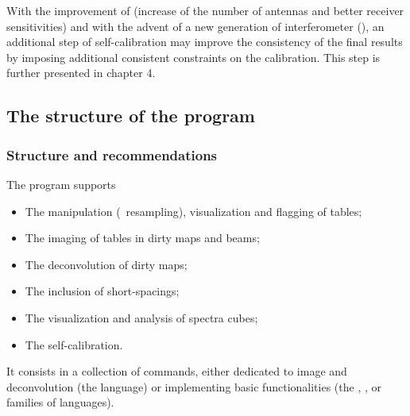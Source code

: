 With the improvement of \NOEMA{} (increase of the number of antennas and
better receiver sensitivities) and with the advent of a new generation of
interferometer (\ALMA{}), an additional step of self-calibration may
improve the consistency of the final results by imposing additional
consistent constraints on the calibration. This step is further presented in chapter 4.

\subsection{The structure of the \imager{} program}

\subsubsection{Structure and recommendations}

The \imager{} program supports
\begin{itemize}
\item The manipulation (\eg\ resampling), visualization and flagging of
  \uv{} tables;
\item The imaging of \uv{} tables in dirty maps and beams;
\item The deconvolution of dirty maps;
\item The inclusion of short-spacings; 
\item The visualization and analysis of spectra cubes;
\item The self-calibration.
\end{itemize}

It consists in a collection of commands, either dedicated to image and deconvolution
  (the  language) or implementing basic functionalities (the
  , , or   families of languages).



